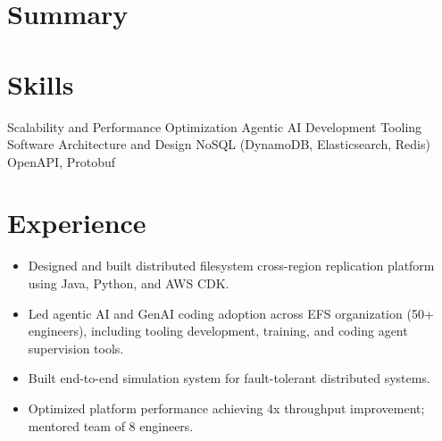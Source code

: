 \documentclass[11pt,a4paper,sans]{moderncv}
\begin{document}
\pagestyle{empty}
\maketitle

\section{\textbf{Summary}}



\section{\textbf{Skills}}


                       {Scalability and Performance Optimization}
                       {Agentic AI Development Tooling}
                       {Software Architecture and Design}
                       {NoSQL (DynamoDB, Elasticsearch, Redis)}
                       {OpenAPI, Protobuf}





\section{\textbf{Experience}}

{ \begin{itemize} \itemsep -2pt
  \item Designed and built distributed filesystem cross-region replication platform using Java, Python, and AWS CDK.
  \item Led agentic AI and GenAI coding adoption across EFS organization (50+ engineers), including tooling development, training, and coding agent supervision tools.
  \item Built end-to-end simulation system for fault-tolerant distributed systems.
  \item Optimized platform performance achieving 4x throughput improvement; mentored team of 8 engineers.
 \end{itemize} }
\end{document}
